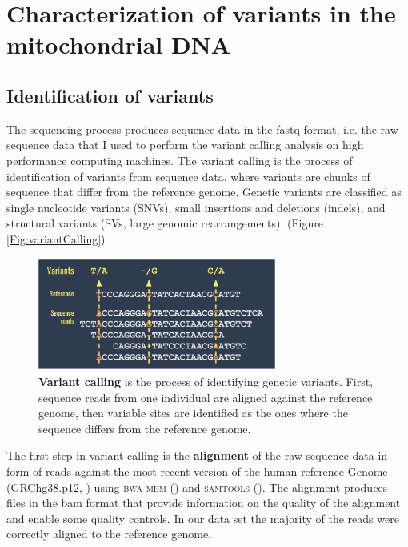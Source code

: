 
\section{Characterization of variants in the mitochondrial DNA}




\subsection{Identification of variants}
The sequencing process produces sequence data in the \gls{fastq} format, i.e. the raw sequence data that I used to perform the variant calling analysis on high performance computing machines. %
The variant calling is the process of identification of variants from sequence data, where variants are chunks of sequence that differ from the reference genome. Genetic variants are classified as single nucleotide variants (SNVs), small insertions and deletions (indels), and structural variants (SVs, large genomic rearrangements). (Figure \ref{Fig:variantCalling})

\begin{figure}[H]
\centering
\includegraphics[width=0.7\textwidth]{Fig/variantCalling.png}
\decoRule
\caption{\textbf{Variant calling} is the process of identifying genetic variants. First, sequence reads from one individual are aligned against the reference genome, then variable sites are identified as the ones where the sequence differs from the reference genome.} 
\label{fig:variantCalling}
\end{figure}



The first step in variant calling is the \textbf{alignment} of the raw sequence data in form of reads against the most recent version of the human reference Genome (GRChg38.p12, \cite{rosenbloom2015ucsc}) using \textsc{bwa-mem} (\cite{li2013aligning}) and \textsc{samtools} (\cite{li2009sequence}). The alignment produces files in the bam format that provide information on the quality of the alignment and enable some quality controls.  In our data set the majority of the reads were correctly aligned to the reference genome. 


